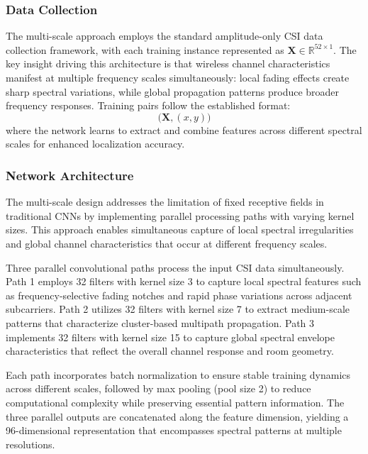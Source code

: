 \subsubsection{Data Collection}
The multi-scale approach employs the standard amplitude-only CSI data collection framework, with each training instance represented as $\mathbf{X} \in \mathbb{R}^{52 \times 1}$. The key insight driving this architecture is that wireless channel characteristics manifest at multiple frequency scales simultaneously: local fading effects create sharp spectral variations, while global propagation patterns produce broader frequency responses. Training pairs follow the established format:
\begin{equation}\label{eq:multiscale_training}
\big(\mathbf{X}, (x,y)\big)
\end{equation}
where the network learns to extract and combine features across different spectral scales for enhanced localization accuracy.

\subsubsection{Network Architecture}
The multi-scale design addresses the limitation of fixed receptive fields in traditional CNNs by implementing parallel processing paths with varying kernel sizes. This approach enables simultaneous capture of local spectral irregularities and global channel characteristics that occur at different frequency scales.

Three parallel convolutional paths process the input CSI data simultaneously. Path 1 employs 32 filters with kernel size 3 to capture local spectral features such as frequency-selective fading notches and rapid phase variations across adjacent subcarriers. Path 2 utilizes 32 filters with kernel size 7 to extract medium-scale patterns that characterize cluster-based multipath propagation. Path 3 implements 32 filters with kernel size 15 to capture global spectral envelope characteristics that reflect the overall channel response and room geometry.

Each path incorporates batch normalization to ensure stable training dynamics across different scales, followed by max pooling (pool size 2) to reduce computational complexity while preserving essential pattern information. The three parallel outputs are concatenated along the feature dimension, yielding a 96-dimensional representation that encompasses spectral patterns at multiple resolutions.

